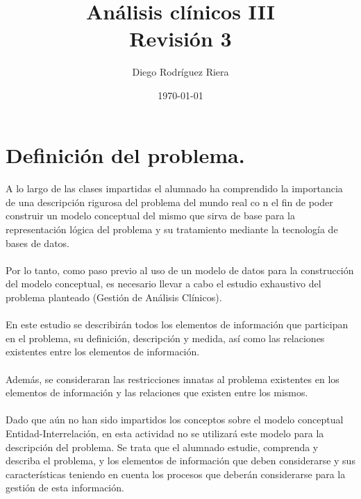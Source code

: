 \documentclass[a4paper,10pt]{article}
\title{Análisis clínicos III\\{\small Revisión 3}}
\author{Diego Rodríguez Riera}
\date{\today}
\begin{document}
\maketitle
\pagebreak
\tableofcontents
\pagebreak

\section{Definición del problema.}
\paragraph{}
A lo largo de las clases impartidas el alumnado ha comprendido la importancia de una descripción rigurosa del problema del mundo real co n el fin de poder construir un modelo conceptual del mismo que sirva de base para la representación lógica del problema y su tratamiento mediante la tecnología de bases de datos.
\paragraph{}
Por lo tanto, como paso previo al uso de un modelo de datos para la construcción del modelo conceptual, es necesario llevar a cabo el estudio exhaustivo del problema planteado (Gestión de Análisis Clínicos).
\paragraph{}
En este estudio se describirán todos los elementos de información que participan en el problema, su definición, descripción y medida, así como las relaciones existentes entre los elementos de información.
\paragraph{}
Además, se consideraran las restricciones innatas al problema existentes en los elementos de información y las relaciones que existen entre los mismos.
\paragraph{}
Dado que aún no han sido impartidos los conceptos sobre el modelo conceptual Entidad-Interrelación, en esta actividad no se utilizará este modelo para la descripción del problema. Se trata que el alumnado estudie, comprenda y describa el problema, y los elementos de información que deben considerarse y sus características teniendo en cuenta los procesos que deberán considerarse para la gestión de esta información.
\pagebreak
\end{document}
